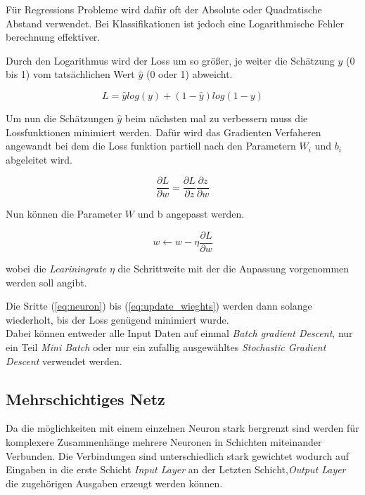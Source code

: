 Für Regressions Probleme wird dafür oft der Absolute oder Quadratische Abstand
verwendet. Bei Klassifikationen ist jedoch eine Logarithmische Fehler berechnung 
effektiver.

Durch den Logarithmus wird der Loss um so größer, je weiter die Schätzung $y$ (0 bis 1) vom 
tatsächlichen Wert $\hat{y}$ (0 oder 1) abweicht. 

\begin{equation}
    \label{eq:crossentropy}
    L = \hat{y}log(y) + (1 - \hat{y})log(1 - y)
\end{equation}


Um nun die Schätzungen $\hat{y}$ beim nächsten mal zu verbessern muss die 
Lossfunktionen minimiert werden. Dafür wird das Gradienten Verfaheren angewandt 
bei dem die Loss funktion partiell nach den Parametern $W_{i}$ und $b_{i}$ 
abgeleitet wird.

\begin{equation}
    \label{eq:grad}
    \frac{\partial L}{\partial w} = \frac{\partial L}{\partial z}\frac{\partial z}{\partial w}
\end{equation}

Nun können die Parameter $W$ und b angepasst werden.

\begin{equation}
    \label{eq:update_wieghts}
    w  \leftarrow w - \eta \frac{\partial L}{\partial w}
\end{equation}

wobei die \textit{Leariningrate} $\eta$ die Schrittweite mit der die Anpassung vorgenommen
werden soll angibt.

Die Sritte (\ref{eq:neuron}) bis (\ref{eq:update_wieghts}) werden dann solange wiederholt, 
bis der Loss genügend minimiert wurde.
\\
Dabei können entweder alle Input Daten auf einmal \textit{Batch 
gradient Descent}, nur ein Teil \textit{Mini Batch} oder nur 
ein zufallig ausgewähltes \textit{Stochastic Gradient 
Descent} verwendet werden.


\subsection{Mehrschichtiges Netz}\label{subsec:mlp}

Da die möglichkeiten mit einem einzelnen Neuron stark bergrenzt sind 
werden für komplexere Zusammenhänge mehrere Neuronen in Schichten 
miteinander Verbunden. Die Verbindungen sind unterschiedlich stark 
gewichtet wodurch auf Eingaben in die erste Schicht \textit{Input Layer} 
an der Letzten Schicht,\textit{Output Layer} die zugehörigen Ausgaben 
erzeugt werden können. 

